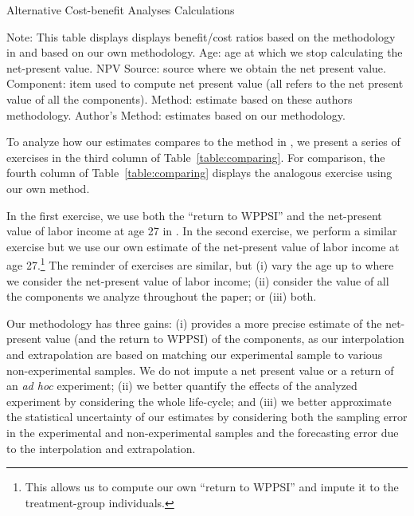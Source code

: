 \begin{table}[!htbp]
\begin{threeparttable}
\caption{Alternative Cost-benefit Analyses Calculations}
\label{table:comparing}
\centering
\footnotesize

\begin{tablenotes}
\footnotesize
\item Note: This table displays displays benefit/cost ratios based on the methodology in \citet{Kline_Walters_2016_QJE} and based on our own methodology. Age: age at which we stop calculating the net-present value. NPV Source: source where we obtain the net present value. Component: item used to compute net present value (all refers to the net present value of all the components). \citet{Kline_Walters_2016_QJE} Method: estimate based on these authors methodology. Author's Method: estimates based on our methodology.
\end{tablenotes}
\end{threeparttable}
\end{table}

To analyze how our estimates compares to the method in \citet{Kline_Walters_2016_QJE}, we present a series of exercises in the third column of Table~\ref{table:comparing}. For comparison, the fourth column of Table~\ref{table:comparing} displays the analogous exercise using our own method.

In the first exercise, we use both the ``return to WPPSI'' and the net-present value of labor income at age 27 in  \citet{Chetty_Friedman_etal_2011_QJoE}. In the second exercise, we perform a similar exercise but we use our own estimate of the net-present value of labor income at age 27.\footnote{This allows us to compute our own ``return to WPPSI'' and impute it to the treatment-group individuals.} The reminder of exercises are similar, but (i) vary the age up to where we consider the net-present value of labor income; (ii) consider the value of all the components we analyze throughout the paper; or (iii) both.

Our methodology has three gains: (i) provides a more precise estimate of the net-present value (and the return to WPPSI) of the components, as our interpolation and extrapolation are based on matching our experimental sample to various non-experimental samples. We do not impute a net present value or a return of an \textit{ad hoc} experiment; (ii) we better quantify the effects of the analyzed experiment by considering the whole life-cycle; and (iii) we better approximate the statistical uncertainty of our estimates by considering both the sampling error in the experimental and non-experimental samples and the forecasting error due to the interpolation and extrapolation.


